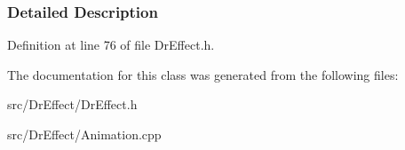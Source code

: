 \subsubsection{\-Detailed \-Description}


\-Definition at line 76 of file \-Dr\-Effect.\-h.



\-The documentation for this class was generated from the following files\-:\begin{DoxyCompactItemize}
\item 
src/\-Dr\-Effect/\-Dr\-Effect.\-h\item 
src/\-Dr\-Effect/\-Animation.\-cpp\end{DoxyCompactItemize}
